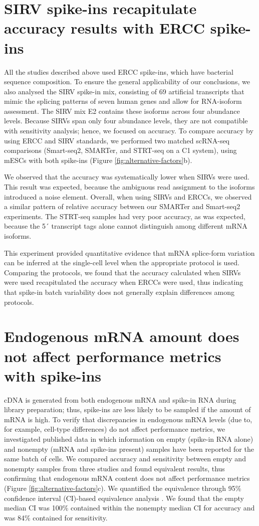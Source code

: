 \section{SIRV spike-ins recapitulate accuracy results with ERCC spike-ins}

All the studies described above used ERCC spike-ins, which have bacterial sequence composition. To ensure the general applicability of our conclusions, we also analysed the SIRV spike-in mix, consisting of 69 artificial transcripts that mimic the splicing patterns of seven human genes and allow for RNA-isoform assessment. The SIRV mix E2 contains these isoforms across four abundance levels. Because SIRVs span only four abundance levels, they are not compatible with sensitivity analysis; hence, we focused on accuracy. To compare accuracy by using ERCC and SIRV standards, we performed two matched scRNA-seq comparisons (Smart-seq2, SMARTer, and STRT-seq on a C1 system), using mESCs with both spike-ins (Figure \ref{fig:alternative-factors}b).

We observed that the accuracy was systematically lower when SIRVs were used. This result was expected, because the ambiguous read assignment to the isoforms introduced a noise element. Overall, when using SIRVs and ERCCs, we observed a similar pattern of relative accuracy between our SMARTer and Smart-seq2 experiments. The STRT-seq samples had very poor accuracy, as was expected, because the 5´ transcript tags alone cannot distinguish among different mRNA isoforms.

This experiment provided quantitative evidence that mRNA splice-form variation can be inferred at the single-cell level when the appropriate protocol is used. Comparing the protocols, we found that the accuracy calculated when SIRVs were used recapitulated the accuracy when ERCCs were used, thus indicating that spike-in batch variability does not generally explain differences among protocols.

\section{Endogenous mRNA amount does not affect performance metrics with spike-ins}

cDNA is generated from both endogenous mRNA and spike-in RNA during library preparation; thus, spike-ins are less likely to be sampled if the amount of mRNA is high. To verify that discrepancies in endogenous mRNA levels (due to, for example, cell-type differences) do not affect performance metrics, we investigated published data in which information on empty (spike-in RNA alone) and nonempty (mRNA and spike-ins present) samples have been reported for the same batch of cells. We compared accuracy and sensitivity between empty and nonempty samples from three studies and found equivalent results, thus confirming that endogenous mRNA content does not affect performance metrics (Figure \ref{fig:alternative-factors}c). We quantified the equivalence through 95\% confidence interval (CI)-based equivalence analysis \cite{Walker2011-qi}. We found that the empty median CI was 100\% contained within the nonempty median CI for accuracy and was 84\% contained for sensitivity.

